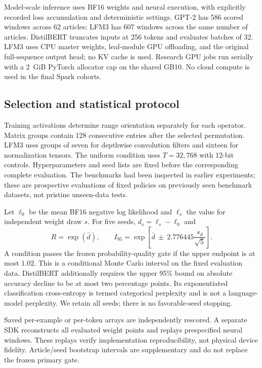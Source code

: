 \documentclass[11pt]{article}
\begin{document}
Model-scale inference uses BF16 weights and neural execution, with explicitly recorded loss accumulation and deterministic settings. GPT-2 has 586 scored windows across 62 articles; LFM3 has 607 windows across the same number of articles. DistilBERT truncates inputs at 256 tokens and evaluates batches of 32. LFM3 uses CPU master weights, leaf-module GPU offloading, and the original full-sequence output head; no KV cache is used. Research GPU jobs run serially with a 2~GiB PyTorch allocator cap on the shared GB10. No cloud compute is used in the final Spark cohorts.

\subsection{Selection and statistical protocol}
Training activations determine range orientation separately for each operator. Matrix groups contain 128 consecutive entries after the selected permutation. LFM3 uses groups of seven for depthwise convolution filters and sixteen for normalization tensors. The uniform condition uses $T=32{,}768$ with 12-bit controls. Hyperparameters and seed lists are fixed before the corresponding complete evaluation. The benchmarks had been inspected in earlier experiments; these are prospective evaluations of fixed policies on previously seen benchmark datasets, not pristine unseen-data tests.

Let $\ell_0$ be the mean BF16 negative log likelihood and $\ell_s$ the value for independent weight draw $s$. For five seeds, $d_s=\ell_s-\ell_0$ and
\begin{equation}
 R=\exp(\bar d),\qquad
 I_{95}=\exp\left[\bar d\ \pm\ 2.776445\frac{s_d}{\sqrt5}\right].
 \label{eq:ci}
\end{equation}
A condition passes the frozen probability-quality gate if the upper endpoint is at most $1.02$. This is a conditional Monte Carlo interval on the fixed evaluation data. DistilBERT additionally requires the upper 95\% bound on absolute accuracy decline to be at most two percentage points. Its exponentiated classification cross-entropy is termed categorical perplexity and is not a language-model perplexity. We retain all seeds; there is no favorable-seed stopping.

Saved per-example or per-token arrays are independently rescored. A separate SDK reconstructs all evaluated weight points and replays prespecified neural windows. These replays verify implementation reproducibility, not physical device fidelity. Article/seed bootstrap intervals are supplementary and do not replace the frozen primary gate.
\end{document}

